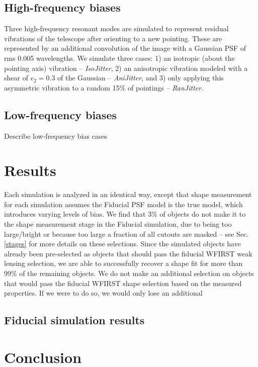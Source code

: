 \documentclass[aps,prd, amsmath,amssymb,superscriptaddress,showkeys,nofootinbib,reprint,preprintnumbers]{revtex4-1}
\newcommand\assign[1]{\todo[color=RoyalPurple!40, inline, size=\small]{Contributing: #1}}
\begin{document}
\subsection{High-frequency biases}\label{sec:low}

Three high-frequency resonant modes are simulated to represent residual vibrations of the telescope after orienting to a new pointing. 
These are represented by an additional convolution of the image with a Gaussian PSF of rms 0.005 wavelengths. We simulate three cases: 1) an isotropic (about the pointing axis) vibration  -- \emph{IsoJitter}, 2) an anisotropic vibration modeled with a shear of $e_2=0.3$ of the Gaussian  -- \emph{AniJitter}, and 3) only applying this asymmetric vibration to a random 15\% of pointings  -- \emph{RanJitter}.

\subsection{Low-frequency biases}\label{sec:high}
\assign{Long}

Describe low-frequency bias cases

\section{Results}\label{sec:results}

Each simulation is analyzed in an identical way, except that shape measurement for each simulation assumes the Fiducial PSF model is the true model, which introduces varying levels of bias. 
We find that 3\% of objects do not make it to the shape measurement stage in the Fiducial simulation, due to being too large/bright or because too large a fraction of all cutouts are masked -- see Sec. \ref{stages} for more details on these selections. 
Since the simulated objects have already been pre-selected as objects that should pass the fiducial WFIRST weak lensing selection, we are able to successfully recover a shape fit for more than 99\% of the remaining objects. 
We do not make an additional selection on objects that would pass the fiducial WFIRST shape selection based on the measured properties. 
If we were to do so, we would only lose an additional 

\subsection{Fiducial simulation results}\label{sec:results}

\section{Conclusion}\label{sec:conclusion}
\end{document}
